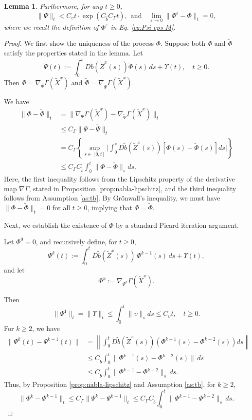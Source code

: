 \documentclass[11pt]{article}
\theoremstyle{definition}
\theoremstyle{plain}
\newtheorem{lemma}[assumption]{Lemma}
\newcommand{\tb}{\tilde{b}}
\newcommand{\veps}{\varepsilon}
\begin{document}
\begin{appendices}
\begin{lemma}
Furthermore, for any \( t \ge 0 \),
\[
\| {\Psi}\|_t < C_\upsilon t \cdot \exp \left(C_{\tb} C_\Gamma t\right), \ \ \text{and} \quad \lim_{\varepsilon \to 0} \| \Phi^\veps - \Phi \|_t  = 0, 
\]
where we recall the definition of $\Phi^\veps$ in Eq. \eqref{eq:Psi-eps-M}.
\end{lemma}

\begin{proof}
We first show the uniqueness of the process \( \Phi \).  
Suppose both \( \Phi \) and \( \tilde{\Phi} \) satisfy the properties stated in the lemma. Let
\[
\tilde{\Psi}(t) := \int_0^t D\tb(\tilde{Z}^x(s)) \tilde{\Phi}(s)\,ds + \Upsilon(t), \quad t\geq 0.
\]
Then \( \Phi = \nabla_{\hat{\Psi}} \Gamma(\tilde{X}^x) \) and \( \tilde{\Phi} = \nabla_{\tilde{\Psi}} \Gamma(\tilde{X}^x) \).

We have
\begin{align*}
\| \Phi - \tilde{\Phi} \|_t & = \| \nabla_{{\Psi}} \Gamma(\tilde{X}^x) - \nabla_{\tilde{\Psi}} \Gamma(\tilde{X}^x) \|_t \\
& \le C_\Gamma \| {\Psi} - \tilde{\Psi} \|_t \\
& = C_\Gamma\left\{\sup_{s\in [0, t]} \Biggl|\int_0^s D\tb (\tilde{Z}^x(s)) \left[\Phi(s) - \tilde{\Phi}(s)\right] ds\Biggr|\right\} \\
& \le C_\Gamma C_{\tb} \int_0^t \| {\Phi} - \tilde{\Phi} \|_s ds.
\end{align*}
Here, the first inequality follows from the Lipschitz property of the derivative map $\nabla \Gamma$, stated in Proposition \ref{prop:nabla-lipschitz}, 
and the third inequality follows from Assumption \ref{as:tb}. By Grönwall's inequality, we must have
$\|\Phi - \tilde{\Phi}\|_t = 0$ for all $t \geq 0$, implying that $\Phi = \tilde \Phi$.

Next, we establish the existence of $\Phi$ by a standard Picard iteration argument.

Let \( \Phi^0 = 0 \), and recursively define, for \( t \ge 0 \),
\[
{\Psi}^k(t) := \int_0^t D\tb(\tilde{Z}^x(s))\, {\Phi}^{k-1}(s)\,ds + \Upsilon(t),
\]
and let
\[
\Phi^k := \nabla_{{\Psi}^k} \Gamma(\tilde{X}^x).
\]

Then
\[
\|{\Psi}^1\|_t = \|\Upsilon\|_t \leq \int_0^t \|\upsilon\|_s ds \leq C_\upsilon t, \quad t \geq 0.
\]
For $k \geq 2$, we have
\begin{align*}
\| {\Psi}^k(t) - \Psi^{k-1}(t) \| 
&= \left\| \int_0^t D\tb(\tilde{Z}^x(s)) \left( \Phi^{k-1}(s) - \Phi^{k-2}(s) \right) ds \right\| \\
&\le C_{\tb} \int_0^t \| \Phi^{k-1}(s) - \Phi^{k-2}(s) \|\,ds \\
&\le C_{\tb} \int_0^t \| \Phi^{k-1} - \Phi^{k-2}\|_s\,ds.
\end{align*}
Thus, by Proposition \ref{prop:nabla-lipschitz} and Assumption \ref{as:tb}, for $k \geq 2$, 
\[
\| \Phi^k - \Phi^{k-1} \|_t \le C_\Gamma \| \Psi^{k} - \Psi^{k-1} \|_t
\le C_\Gamma C_{\tb} \int_0^t \| \Phi^{k-1} - \Phi^{k-2} \|_s\, ds.
\]


\end{proof}
\end{appendices}
\end{document}
